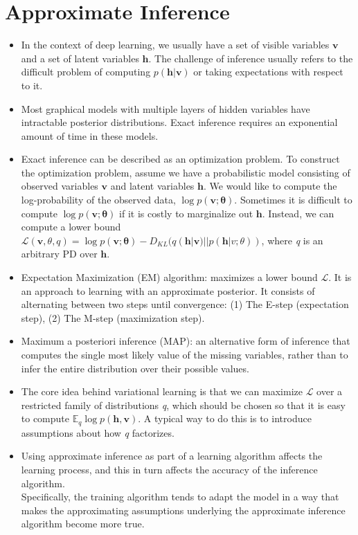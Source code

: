 \documentclass{article}
\begin{document}
\section{Approximate Inference}
\begin{itemize}
\item In the context of deep learning, we usually have a set of visible variables \(\boldsymbol{v}\) and a set of latent variables \(\boldsymbol{h}\). The challenge of inference usually refers to the difficult problem of computing \(p(\boldsymbol{h}|\boldsymbol{v})\) or taking expectations with respect to it.
\item Most graphical models with multiple layers of hidden variables have intractable posterior distributions. Exact inference requires an exponential amount of time in these models.
\item Exact inference can be described as an optimization problem. To construct the optimization problem, assume we have a probabilistic model consisting of observed variables \(\boldsymbol{v}\) and latent variables \(\boldsymbol{h}\). We would like to compute the log-probability of the observed data, \(\log p(\boldsymbol{v}; \boldsymbol{\theta})\). Sometimes it is difficult to compute \(\log p(\boldsymbol{v}; \boldsymbol{\theta})\) if it is costly to marginalize out \(\boldsymbol{h}\). Instead, we can compute a lower bound \(\mathcal{L}(\boldsymbol{v}, \theta, q) = \log p(\boldsymbol{v}; \boldsymbol{\theta}) - D_{KL} (q(\boldsymbol{h}|\boldsymbol{v})||p(\boldsymbol{h}|v;\theta))\), where \textit{q} is an arbitrary PD over \(\boldsymbol{h}\).
\item Expectation Maximization (EM) algorithm: maximizes a lower bound \(\mathcal{L}\). It is an approach to learning with an approximate posterior. It consists of alternating between two steps until convergence: (1) The E-step (expectation step), (2) The M-step (maximization step).
\item Maximum a posteriori inference (MAP): an alternative form of inference that computes the single most likely value of the missing variables, rather than to infer the entire distribution over their possible values.
\item The core idea behind variational learning is that we can maximize \(\mathcal{L}\) over a restricted family of distributions \textit{q}, which should be chosen so that it is easy to compute \(\mathbb{E}_q \log p(\boldsymbol{h},\boldsymbol{v})\). A typical way to do this is to introduce assumptions about how \textit{q} factorizes.
\item Using approximate inference as part of a learning algorithm affects the learning process, and this in turn affects the accuracy of the inference algorithm.\\Specifically, the training algorithm tends to adapt the model in a way that makes the approximating assumptions underlying the approximate inference algorithm become more true.

\end{itemize}
\end{document}
